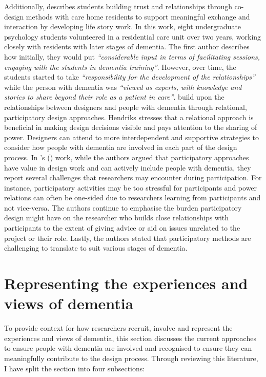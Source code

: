 Additionally, \cite{foley_student_2020} describes students building trust and relationships through co-design methods with care home residents to support meaningful exchange and interaction by developing life story work. In this work, eight undergraduate psychology students volunteered in a residential care unit over two years, working closely with residents with later stages of dementia. The first author describes how initially, they would put \textit{``considerable input in terms of facilitating sessions, engaging with the students in dementia training''}. However, over time, the students started to take \textit{``responsibility for the development of the relationships''} while the person with dementia was \textit{``viewed as experts, with knowledge and stories to share beyond their role as a patient in care''\citep[p.9]{foley_student_2020}}. \cite{hendriks_valuing_2018} build upon the relationships between designers and people with dementia through relational, participatory design approaches. Hendriks stresses that a relational approach is beneficial in making design decisions visible and pays attention to the sharing of power. Designers can attend to more interdependent and supportive strategies to consider how people with dementia are involved in each part of the design process. In \citeauthor{hendriks_challenges_2014}'s (\citeyear{hendriks_challenges_2014}) work, while the authors argued that participatory approaches have value in design work and can actively include people with dementia, they report several challenges that researchers may encounter during participation. For instance, participatory activities may be too stressful for participants and power relations can often be one-sided due to researchers learning from participants and not vice-versa. The authors continue to emphasise the burden participatory design might have on the researcher who builds close relationships with participants to the extent of giving advice or aid on issues unrelated to the project or their role. Lastly, the authors stated that participatory methods are challenging to translate to suit various stages of dementia.

\section{Representing the experiences and views of dementia}
\label{BL:Outside-HCI}
To provide context for how researchers recruit, involve and represent the experiences and views of dementia, this section discusses the current approaches to ensure people with dementia are involved and recognised to ensure they can meaningfully contribute to the design process. Through reviewing this literature, I have split the section into four subsections:


